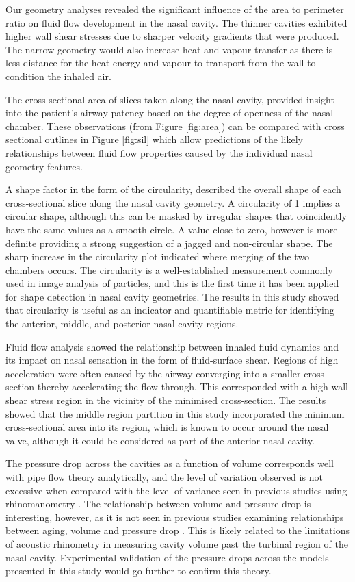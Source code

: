 Our geometry analyses revealed the significant influence of the area to perimeter ratio on fluid flow development in the nasal cavity. The thinner cavities exhibited higher wall shear stresses due to sharper velocity gradients that were produced. The narrow geometry would also increase heat and vapour transfer as there is less distance for the heat energy and vapour to transport from the wall to condition the inhaled air.

The cross-sectional area of slices taken along the nasal cavity, provided insight into the patient’s airway patency based on the degree of openness of the nasal chamber. These observations (from Figure \ref{fig:area}) can be compared with cross sectional outlines in Figure \ref{fig:sil} which allow predictions of the likely relationships between fluid flow properties caused by the individual nasal geometry features.

A shape factor in the form of the circularity,   described the overall shape of each cross-sectional slice along the nasal cavity geometry. A circularity of 1 implies a circular shape, although this can be masked by irregular shapes that coincidently have the same values as a smooth circle. A value close to zero, however is more definite providing a strong suggestion of a jagged and non-circular shape. The sharp increase in the circularity plot indicated where merging of the two chambers occurs. The circularity is a well-established measurement commonly used in image analysis of particles, and this is the first time it has been applied for shape detection in nasal cavity geometries. The results in this study showed that circularity is useful as an indicator and quantifiable metric for identifying the anterior, middle, and posterior nasal cavity regions.

Fluid flow analysis showed the relationship between inhaled fluid dynamics and its impact on nasal sensation in the form of fluid-surface shear. Regions of high acceleration were often caused by the airway converging into a smaller cross-section thereby accelerating the flow through.  This corresponded with a high wall shear stress region in the vicinity of the minimised cross-section. The results showed that the middle region partition in this study incorporated the minimum cross-sectional area into its region, which is known to occur around the nasal valve, although it could be considered as part of the anterior nasal cavity.

The pressure drop across the cavities as a function of volume corresponds well with pipe flow theory analytically, and the level of variation observed is not excessive when compared with the level of variance seen in previous studies using rhinomanometry \cite{Edelstein1996}. The relationship between volume and pressure drop is interesting, however, as it is not seen in previous studies examining relationships between aging, volume and pressure drop \cite{Lindemann2008}. This is likely related to the limitations of acoustic rhinometry in measuring cavity volume past the turbinal region of the nasal cavity. Experimental validation of the pressure drops across the models presented in this study would go further to confirm this theory.

